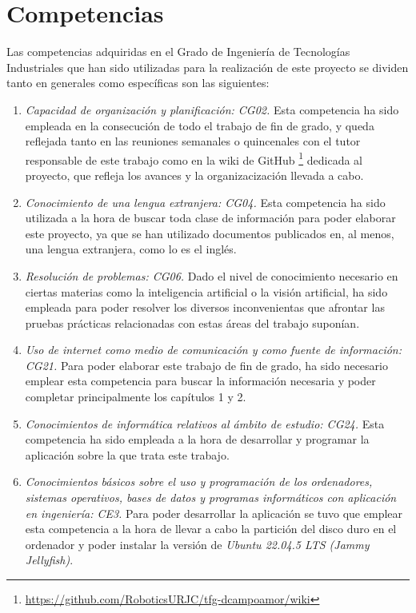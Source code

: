 \section{Competencias}
\label{sec:competencias}

Las competencias adquiridas en el Grado de Ingeniería de Tecnologías Industriales que han sido utilizadas para la realización de este proyecto se dividen tanto en generales como específicas son las siguientes:

\begin{enumerate} 
  \item \textit{Capacidad de organización y planificación: CG02.} Esta competencia ha sido empleada en la consecución de todo el trabajo de fin de grado, y queda reflejada tanto en las reuniones semanales o quincenales con el tutor responsable de este trabajo como en la wiki de GitHub \footnote{\url{https://github.com/RoboticsURJC/tfg-dcampoamor/wiki}} dedicada al proyecto, que refleja los avances y la organizacización llevada a cabo.  
  \item \textit{Conocimiento de una lengua extranjera: CG04.} Esta competencia ha sido utilizada a la hora de buscar toda clase de información para poder elaborar este proyecto, ya que se han utilizado documentos publicados en, al menos, una lengua extranjera, como lo es el inglés.
  \item \textit{Resolución de problemas: CG06.} Dado el nivel de conocimiento necesario en ciertas materias como la inteligencia artificial o la visión artificial, ha sido empleada para poder resolver los diversos inconvenientas que afrontar las pruebas prácticas relacionadas con estas áreas del trabajo suponían.
  \item \textit{Uso de internet como medio de comunicación y como fuente de información: CG21.} Para poder elaborar este trabajo de fin de grado, ha sido necesario emplear esta competencia para buscar la información necesaria y poder completar principalmente los capítulos 1 y 2.
  \item \textit{Conocimientos de informática relativos al ámbito de estudio: CG24.} Esta competencia ha sido empleada a la hora de desarrollar y programar la aplicación sobre la que trata este trabajo.
  \item \textit{Conocimientos básicos sobre el uso y programación de los ordenadores, sistemas operativos, bases de datos y programas informáticos con aplicación en ingeniería: CE3.} Para poder desarrollar la aplicación se tuvo que emplear esta competencia a la hora de llevar a cabo la partición del disco duro en el ordenador y poder instalar la versión de \textit{Ubuntu 22.04.5 LTS (Jammy Jellyfish)}.  

\end{enumerate}

